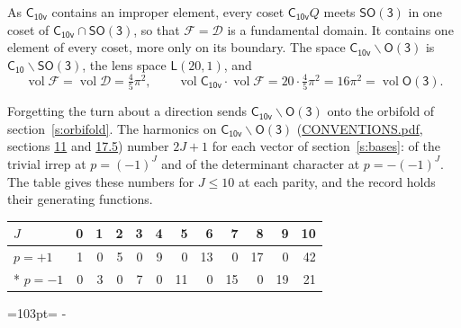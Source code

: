\documentclass[10pt,a4paper]{article}
\newcommand{\needspace}[1]{\par\penalty-100\begingroup\dimen0=#1\relax\dimen2=\pagegoal
  \advance\dimen2-\pagetotal\ifdim\dimen0>\dimen2\relax\ifdim\dimen2>0pt\vfil\break\fi\fi
  \endgroup}
\numberwithin{equation}{section}
\newcommand{\grp}[1]{\mathsf{#1}}
\newcommand{\vol}{\operatorname{vol}}
\newcommand{\fcell}{\mathcal{D}}
\newcommand{\fdomain}{\mathcal{F}}
\newcommand{\lensspace}[2]{\mathsf{L}(#1, #2)}
\begin{document}
\leavevmode\label{n:set.fundamental}As $\grp{C_{10v}}$ contains an improper element, every coset $\grp{C_{10v}}Q$ meets \href{SO3.pdf}{$\grp{SO(3)}$} in one coset of $\grp{C_{10v}} \cap \grp{SO(3)}$, so that $\fdomain = \fcell$ is a fundamental domain. It contains one element of every coset, more only on its boundary.
\leavevmode\label{n:set.lens}The space $\grp{C_{10v}}\backslash\grp{O(3)}$ is $\grp{C_{10}}\backslash\grp{SO(3)}$, the lens space $\lensspace{20}{1}$, and
\begin{equation}\label{e:volume}\vol\fdomain = \vol\fcell = \tfrac{4}{5}\pi^2,\qquad \vol\grp{C_{10v}}\cdot\vol\fdomain = 20\cdot \tfrac{4}{5}\pi^2 = 16\pi^2 = \vol\grp{O(3)}.\end{equation}

Forgetting the turn about a direction sends $\grp{C_{10v}}\backslash\grp{O(3)}$ onto the orbifold of section~\ref{s:orbifold}.
The harmonics on $\grp{C_{10v}}\backslash\grp{O(3)}$ (\href{../../CONVENTIONS.pdf}{CONVENTIONS.pdf}, sections \href{../../CONVENTIONS.pdf\#conv.11}{11} and \href{../../CONVENTIONS.pdf\#conv.17.5}{17.5}) number $2J + 1$ for each vector of section~\ref{s:bases}: of the trivial irrep at $p = (-1)^J$ and of the determinant character at $p = -(-1)^J$. The table gives these numbers for $J \le 10$ at each parity, and the record holds their generating functions.
{\small\setlength{\tabcolsep}{4pt}\begin{longtable}{@{}lrrrrrrrrrrr@{}}\toprule
$J$ & 0 & 1 & 2 & 3 & 4 & 5 & 6 & 7 & 8 & 9 & 10\\\midrule\endhead
\bottomrule\endfoot\endlastfoot
$p = +1$ & 1 & 0 & 5 & 0 & 9 & 0 & 13 & 0 & 17 & 0 & 42\\*
$p = -1$ & 0 & 3 & 0 & 7 & 0 & 11 & 0 & 15 & 0 & 19 & 21\\
\bottomrule\end{longtable}}
\needspace{103pt}
\end{document}
